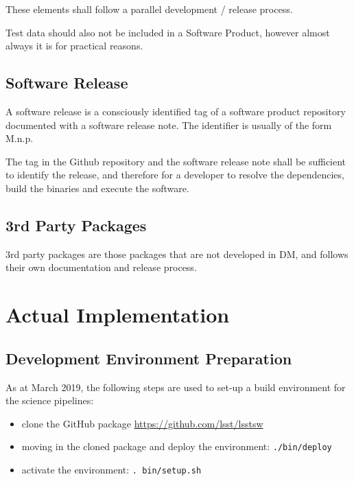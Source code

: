 These elements shall follow a parallel development / release process.

Test data should also not be included in a Software Product, however almost always it is for practical reasons.


\subsection{Software Release} \label{sec:defrelease}

A software release is a consciously identified tag of a software product repository
documented with a software release note.
The identifier is usually of the form M.n.p.%

The tag in the Github repository and the software release note shall be sufficient to identify the release, and therefore for a developer
to resolve the dependencies, build the binaries and execute the software.

\subsection{3rd Party Packages}

3rd party packages are those packages that are not developed in DM, and follows their own documentation and release process.


\newpage
\section{Actual Implementation} \label{sec:actual}

\subsection{Development Environment Preparation} \label{sec:envset} 
As at March 2019, the following steps are used to set-up a build environment for the science pipelines:

\begin{itemize}
\item clone the GitHub package \url{https://github.com/lsst/lsstsw}
\item moving in the cloned package and deploy the environment: \texttt{./bin/deploy}
\item activate the environment: \texttt{. bin/setup.sh}
\end{itemize}

